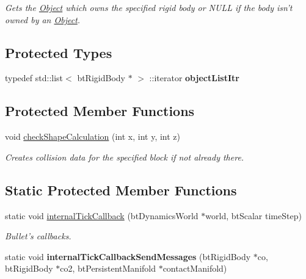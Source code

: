 \begin{DoxyCompactItemize}
\begin{DoxyCompactList}\small\item\em \-Gets the \hyperlink{classObject}{\-Object} which owns the specified rigid body or \-N\-U\-L\-L if the body isn't owned by an \hyperlink{classObject}{\-Object}. \end{DoxyCompactList}\end{DoxyCompactItemize}
\subsection*{\-Protected \-Types}
\begin{DoxyCompactItemize}
\item 
\hypertarget{classPhysics_a3ed5d1495f629d339b122a97883d7f7f}{
typedef std\-::list$<$ bt\-Rigid\-Body $\ast$ $>$\*
\-::iterator {\bfseries object\-List\-Itr}}
\label{d4/d2d/classPhysics_a3ed5d1495f629d339b122a97883d7f7f}

\end{DoxyCompactItemize}
\subsection*{\-Protected \-Member \-Functions}
\begin{DoxyCompactItemize}
\item 
\hypertarget{classPhysics_a307ff9df1ce6b101b81255b8ba392556}{
void \hyperlink{classPhysics_a307ff9df1ce6b101b81255b8ba392556}{check\-Shape\-Calculation} (int x, int y, int z)}
\label{d4/d2d/classPhysics_a307ff9df1ce6b101b81255b8ba392556}

\begin{DoxyCompactList}\small\item\em \-Creates collision data for the specified block if not already there. \end{DoxyCompactList}\end{DoxyCompactItemize}
\subsection*{\-Static \-Protected \-Member \-Functions}
\begin{DoxyCompactItemize}
\item 
\hypertarget{classPhysics_a4af4b513fb5f32264062088a7aea4c86}{
static void \hyperlink{classPhysics_a4af4b513fb5f32264062088a7aea4c86}{internal\-Tick\-Callback} (bt\-Dynamics\-World $\ast$world, bt\-Scalar time\-Step)}
\label{d4/d2d/classPhysics_a4af4b513fb5f32264062088a7aea4c86}

\begin{DoxyCompactList}\small\item\em \-Bullet's callbacks. \end{DoxyCompactList}\item 
\hypertarget{classPhysics_ade3ad9b6f0925b9e89c2a082660a49fe}{
static void {\bfseries internal\-Tick\-Callback\-Send\-Messages} (bt\-Rigid\-Body $\ast$co, bt\-Rigid\-Body $\ast$co2, bt\-Persistent\-Manifold $\ast$contact\-Manifold)}
\label{d4/d2d/classPhysics_ade3ad9b6f0925b9e89c2a082660a49fe}

\end{DoxyCompactItemize}
